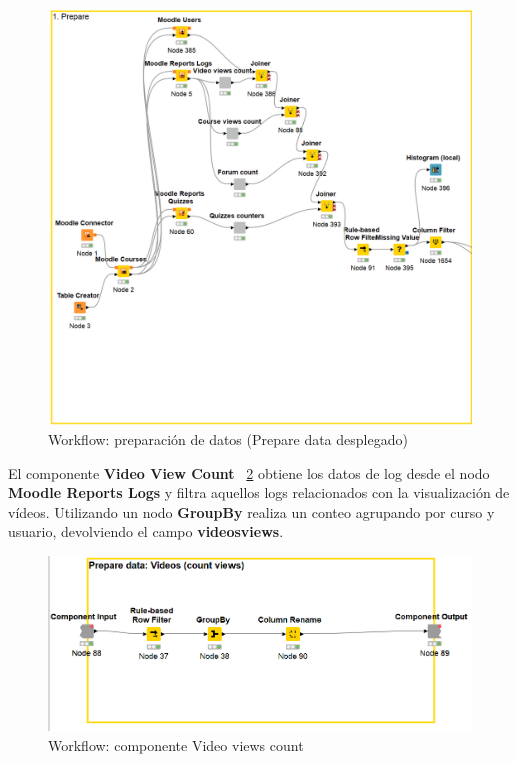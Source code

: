 \begin{figure}[!htb]
	\centering
	\includegraphics[width=1\textwidth]{img/workflow1.png}
	\caption{Workflow: preparación de datos (Prepare data desplegado)}
	\label{fig:workflow1}
\end{figure}
\FloatBarrier

El componente \textbf{Video View Count} ~\ref{fig:workflow1a} obtiene los datos de log desde el nodo \textbf{Moodle Reports Logs} y filtra aquellos
logs relacionados con la visualización de vídeos. Utilizando un nodo \textbf{GroupBy} realiza un conteo agrupando por curso y usuario, devolviendo el campo \textbf{videosviews}.

\begin{figure}[!htb]
	\centering
	\includegraphics[width=1\textwidth]{img/workflow1a.png}
	\caption{Workflow: componente Video views count}
	\label{fig:workflow1a}
\end{figure}
\FloatBarrier

